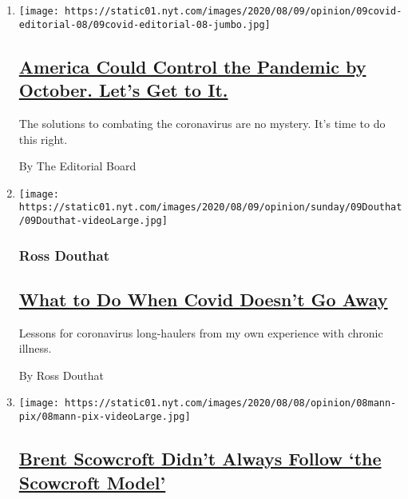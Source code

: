 \begin{enumerate}
\def\labelenumi{\arabic{enumi}.}
\item
  \texttt{[image: https://static01.nyt.com/images/2020/08/09/opinion/09covid-editorial-08/09covid-editorial-08-jumbo.jpg]}

  \hypertarget{america-could-control-the-pandemic-by-october-lets-get-to-it}{%
  \subsection{\texorpdfstring{\href{/2020/08/08/opinion/sunday/coronavirus-response-testing-lockdown.html}{America
  Could Control the Pandemic by October. Let's Get to
  It.}}{America Could Control the Pandemic by October. Let's Get to It.}}\label{america-could-control-the-pandemic-by-october-lets-get-to-it}}

  The solutions to combating the coronavirus are no mystery. It's time
  to do this right.

  By The Editorial Board
\item
  \texttt{[image: https://static01.nyt.com/images/2020/08/09/opinion/sunday/09Douthat/09Douthat-videoLarge.jpg]}

  \hypertarget{ross-douthat}{%
  \subsubsection{Ross Douthat}\label{ross-douthat}}

  \hypertarget{what-to-do-when-covid-doesnt-go-away}{%
  \subsection{\texorpdfstring{\href{/2020/08/08/opinion/sunday/covid-lyme-treatment-medicine.html}{What
  to Do When Covid Doesn't Go
  Away}}{What to Do When Covid Doesn't Go Away}}\label{what-to-do-when-covid-doesnt-go-away}}

  Lessons for coronavirus long-haulers from my own experience with
  chronic illness.

  By Ross Douthat
\item
  \texttt{[image: https://static01.nyt.com/images/2020/08/08/opinion/08mann-pix/08mann-pix-videoLarge.jpg]}

  \hypertarget{brent-scowcroft-didnt-always-follow-the-scowcroft-model}{%
  \subsection{\texorpdfstring{\href{/2020/08/08/opinion/brent-scowcroft-model-foreign-policy.html}{Brent
  Scowcroft Didn't Always Follow `the Scowcroft
  Model'}}{Brent Scowcroft Didn't Always Follow `the Scowcroft Model'}}\label{brent-scowcroft-didnt-always-follow-the-scowcroft-model}}


\end{enumerate}
